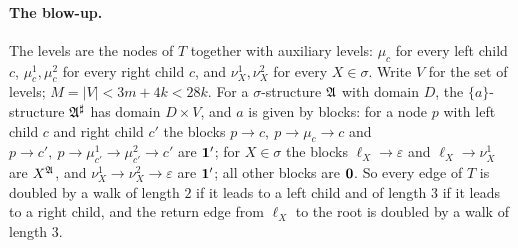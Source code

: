 \paragraph{The blow-up.}
The levels are the nodes of $T$ together with auxiliary levels: $\mu_c$ for
every left child $c$, $\mu^1_c,\mu^2_c$ for every right child $c$, and
$\nu^1_X,\nu^2_X$ for every $X\in\sigma$. Write $V$ for the set of levels;
$M=|V|<3m+4k<28k$.
For a $\sigma$-structure $\mathfrak A$ with domain $D$, the $\{a\}$-structure
$\mathfrak A^\sharp$ has domain $D\times V$, and $a$ is given by blocks: for a node
$p$ with left child $c$ and right child $c'$ the blocks
$p\to c,\ p\to\mu_c\to c$ and
$p\to c',\ p\to\mu^1_{c'}\to\mu^2_{c'}\to c'$ are $\mathbf{1}'$; for $X\in\sigma$
the blocks $\ell_X\to\varepsilon$ and $\ell_X\to\nu^1_X$ are $X^{\mathfrak A}$, and
$\nu^1_X\to\nu^2_X\to\varepsilon$ are $\mathbf{1}'$; all other blocks are $\mathbf{0}$. So every
edge of $T$ is doubled by a walk of length $2$ if it leads to a left child
and of length $3$ if it leads to a right child, and the return edge from
$\ell_X$ to the root is doubled by a walk of length $3$.

